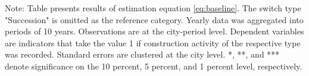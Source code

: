 \begin{table}[htbp]
\begin{tabular}{lcccc}
      
   \end{tabular}
   
   \par \raggedright 
   Note: Table presents results of estimation equation \eqref{eq:baseline}. The switch type "Succession" is omitted as the  reference category. Yearly data was aggregated into periods of 10 years. Observations are at the city-period  level. Dependent variables are indicators that take the value 1 if  construction activity of the respective type was recorded. Standard errors are  clustered at the city level. *, **, and *** denote significance on the 10 percent, 5 percent, and 1 percent  level, respectively.
\end{table}
